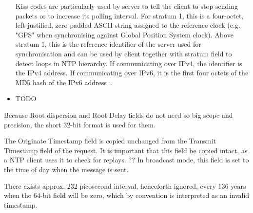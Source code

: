 \begin{itemize}
Kiss codes are particularly used by server to tell the client to stop sending packets or
to increase its polling interval.
For stratum 1, this is a four-octet, left-justified, zero-padded ASCII
string assigned to the reference clock (e.g. "GPS" when synchronising against Global Position System clock).
Above stratum 1, this is the reference identifier of the server used for synchronisation
and can be used by client together with stratum field to detect loops in NTP hierarchy.
If communicating over IPv4, the identifier is the IPv4 address.
If communicating over IPv6, it is the first four octets of the MD5 hash of the IPv6 address~\cite{rfc5905}.
\item
TODO
\end{itemize}

Because Root dispersion and Root Delay fields do not need so big scope and precision,
the short 32-bit format is used for them.

The Originate Timestamp field is copied
   unchanged from the Transmit Timestamp field of the request. It is
   important that this field be copied intact, as a NTP client uses it
   to check for replays.
  ?? In broadcast mode, this field is set to the
   time of day when the message is sent.
%

There exists approx. 232-picosecond interval, henceforth ignored, every 136 years when
the 64-bit field will be zero, which by convention is interpreted as an invalid timestamp.
